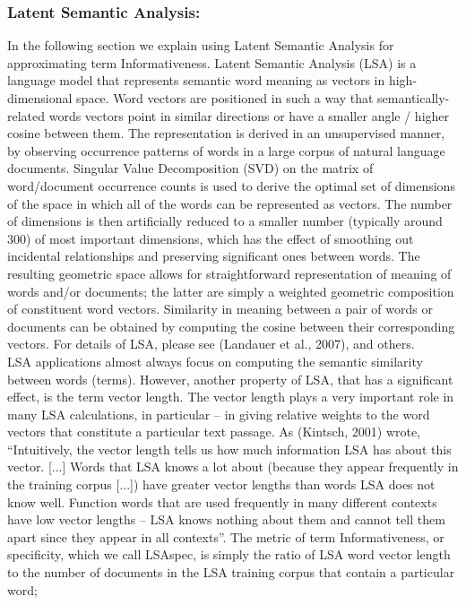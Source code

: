 \subsubsection{Latent Semantic Analysis:}
In the following section we explain using Latent Semantic Analysis for approximating term Informativeness. Latent Semantic Analysis (LSA) is a language model that represents semantic word meaning as vectors in high-dimensional space. Word vectors are positioned in such a way that semantically-related words vectors point in similar directions or have a smaller angle / higher cosine between them. The representation is derived in an unsupervised manner, by observing occurrence patterns of words in a large corpus of natural language documents. Singular Value Decomposition (SVD) on the matrix of word/document occurrence counts is used to derive the optimal set of dimensions of the space in which all of the words can be represented as vectors. The number of dimensions is then artificially reduced to a smaller number (typically around 300) of most important dimensions, which has the effect of smoothing out incidental relationships and preserving significant ones between words. The resulting geometric space allows for straightforward representation of meaning of words and/or documents; the latter are simply a weighted geometric composition of constituent word vectors. Similarity in meaning between a pair of words or documents can be obtained by computing the cosine between their corresponding vectors. For details of LSA, please see (Landauer et al., 2007), and others.\\
LSA applications almost always focus on computing the semantic similarity between words (terms). However, another property of LSA, that has a significant effect, is the term vector length. The vector length plays a very important role in many LSA calculations, in particular – in giving relative weights to the word vectors that constitute a particular text passage. As (Kintsch, 2001) wrote, “Intuitively, the vector length tells us how much information LSA has about this vector. [...] Words that LSA knows a lot about (because they appear frequently in the training corpus [...]) have greater vector lengths than words LSA does not know well. Function words that are used frequently in many different contexts have low vector lengths -- LSA knows nothing about them and cannot tell them apart since they appear in all contexts”.
The metric of term Informativeness, or specificity, which we call LSAspec, is simply the ratio of LSA word vector length to the number of documents in the LSA training corpus that contain a particular word;
